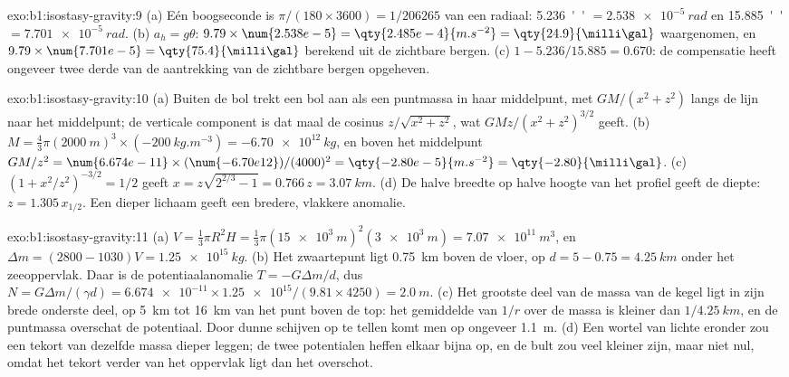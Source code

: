 \begin{solution}{exo:b1:isostasy-gravity:9}
(a) Eén boogseconde is $\pi/(180\times3600) = 1/\num{206265}$ van een radiaal:
\qty{5.236}{''} $= \qty{2.538e-5}{rad}$ en \qty{15.885}{''} $=
\qty{7.701e-5}{rad}$. (b) $a_h = g\theta$: $9.79\times\num{2.538e-5} =
\qty{2.485e-4}{m.s^{-2}} = \qty{24.9}{\milli\gal}$ waargenomen, en
$9.79\times\num{7.701e-5} = \qty{75.4}{\milli\gal}$ berekend uit de zichtbare
bergen. (c) $1 - 5.236/15.885 = 0.670$: de compensatie heeft ongeveer twee derde van de aantrekking van de zichtbare bergen opgeheven.
\end{solution}

\begin{solution}{exo:b1:isostasy-gravity:10}
(a) Buiten de bol trekt een bol aan als een puntmassa in haar middelpunt, met
$GM/(x^2 + z^2)$ langs de lijn naar het middelpunt; de verticale component is dat maal de cosinus $z/\sqrt{x^2 + z^2}$, wat $GMz/(x^2 + z^2)^{3/2}$ geeft.
(b) $M = \tfrac43\pi(\qty{2000}{m})^3\times(\qty{-200}{kg.m^{-3}}) =
\qty{-6.70e12}{kg}$, en boven het middelpunt $GM/z^2 = \num{6.674e-11}\times
(\num{-6.70e12})/(4000)^2 = \qty{-2.80e-5}{m.s^{-2}} = \qty{-2.80}{\milli\gal}$.
(c) $(1 + x^2/z^2)^{-3/2} = 1/2$ geeft $x = z\sqrt{2^{2/3} - 1} = 0.766\,z =
\qty{3.07}{km}$. (d) De halve breedte op halve hoogte van het profiel geeft de diepte: $z = 1.305\,x_{1/2}$. Een dieper lichaam geeft een bredere, vlakkere anomalie.
\end{solution}

\begin{solution}{exo:b1:isostasy-gravity:11}
(a) $V = \tfrac13\pi R^2 H = \tfrac13\pi(\qty{15e3}{m})^2(\qty{3e3}{m}) =
\qty{7.07e11}{m^3}$, en $\Delta m = (2800 - 1030)V = \qty{1.25e15}{kg}$.
(b) Het zwaartepunt ligt \qty{0.75}{km} boven de vloer, op $d = 5 - 0.75 = \qty{4.25}{km}$ onder het zeeoppervlak. Daar is de potentiaalanomalie $T = -G\Delta m/d$, dus $N = G\Delta m/(\gamma d) =
\num{6.674e-11}\times\num{1.25e15}/(9.81\times4250) = \qty{2.0}{m}$.
(c) Het grootste deel van de massa van de kegel ligt in zijn brede onderste deel, op \qty{5}{km} tot \qty{16}{km} van het punt boven de top: het gemiddelde van $1/r$ over de massa is kleiner dan $1/\qty{4.25}{km}$, en de puntmassa overschat de potentiaal. Door dunne schijven op te tellen komt men op ongeveer \qty{1.1}{m}.
(d) Een wortel van lichte  eronder zou een tekort van dezelfde massa dieper leggen; de twee potentialen heffen elkaar bijna op, en de bult zou veel kleiner zijn, maar niet nul, omdat het tekort verder van het oppervlak ligt dan het overschot.
\end{solution}

